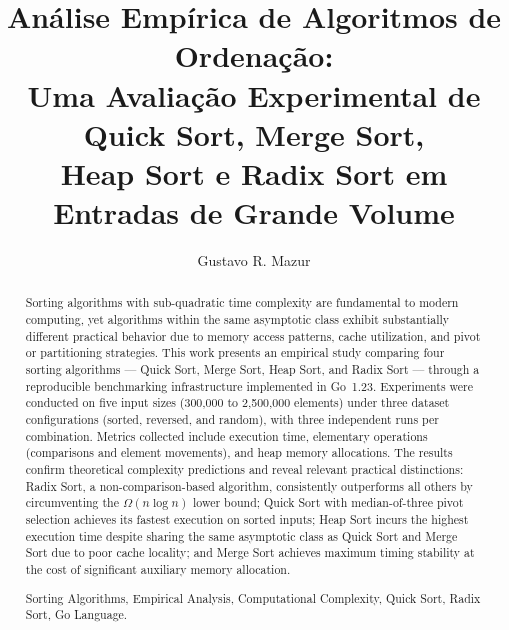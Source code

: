 \documentclass[12pt]{article}
\title{Análise Empírica de Algoritmos de Ordenação:\\
       Uma Avaliação Experimental de Quick Sort, Merge Sort,\\
       Heap Sort e Radix Sort em Entradas de Grande Volume}
\author{Gustavo R. Mazur\inst{1}}
\begin{document}
\maketitle

\begin{abstract}
Sorting algorithms with sub-quadratic time complexity are fundamental
to modern computing, yet algorithms within the same asymptotic class
exhibit substantially different practical behavior due to memory access
patterns, cache utilization, and pivot or partitioning strategies.
This work presents an empirical study comparing four sorting algorithms
--- Quick Sort, Merge Sort, Heap Sort, and Radix Sort --- through a
reproducible benchmarking infrastructure implemented in Go~1.23.
Experiments were conducted on five input sizes (300,000 to 2,500,000
elements) under three dataset configurations (sorted, reversed, and
random), with three independent runs per combination. Metrics collected
include execution time, elementary operations (comparisons and element
movements), and heap memory allocations. The results confirm theoretical
complexity predictions and reveal relevant practical distinctions:
Radix Sort, a non-comparison-based algorithm, consistently outperforms
all others by circumventing the $\Omega(n \log n)$ lower bound; Quick Sort
with median-of-three pivot selection achieves its fastest execution on
sorted inputs; Heap Sort incurs the highest execution time despite
sharing the same asymptotic class as Quick Sort and Merge Sort due to
poor cache locality; and Merge Sort achieves maximum timing stability
at the cost of significant auxiliary memory allocation.

 Sorting Algorithms, Empirical Analysis,
Computational Complexity, Quick Sort, Radix Sort, Go Language.
\end{abstract}
\end{document}

